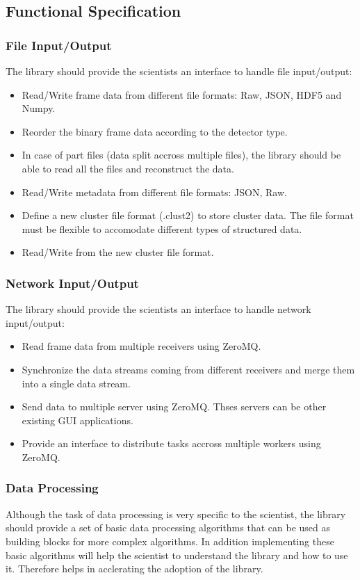 \begin{spacing}{1.2}
    \subsection{Functional Specification}
    \subsubsection{File Input/Output}
    The library should provide the scientists an interface to handle file input/output:
    \begin{itemize}
        \item Read/Write frame data from different file formats: Raw, JSON, HDF5 and Numpy.
        \item Reorder the binary frame data according to the detector type.
        \item In case of part files (data split accross multiple files), the library should be able to read all the files and reconstruct the data.
        \item Read/Write metadata from different file formats: JSON, Raw.
        \item Define a new cluster file format (.clust2) to store cluster data. The file format must
              be flexible to accomodate different types of structured data.
        \item Read/Write from the new cluster file format.
    \end{itemize}

    \subsubsection{Network Input/Output}
    The library should provide the scientists an interface to handle network input/output:
    \begin{itemize}
        \item Read frame data from multiple receivers using ZeroMQ. \cite{hintjens2013zeromq}
        \item Synchronize the data streams coming from different receivers and merge them into a single data stream.
        \item Send data to multiple server using ZeroMQ. Thses servers can be other existing GUI applications.
        \item Provide an interface to distribute tasks accross multiple workers using ZeroMQ.
    \end{itemize}

    \subsubsection{Data Processing}
    Although the task of data processing is very specific to the scientist, the library should provide a set of
    basic data processing algorithms that can be used as building blocks for more complex algorithms.
    In addition implementing these basic algorithms will help the scientist to understand the library and how to use it.
    Therefore helps in acclerating the adoption of the library.


\end{spacing}
